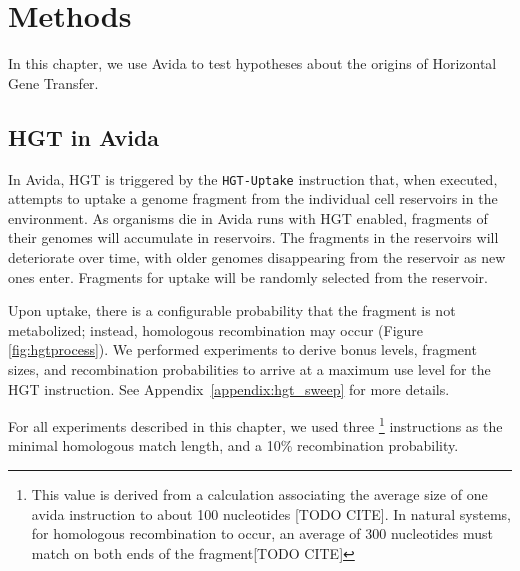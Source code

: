 \documentclass[PhD]{msu-thesis}
\begin{document}
\section{Methods}
In this chapter, we use Avida to test hypotheses about the origins of Horizontal Gene Transfer. 

\subsection{HGT in Avida}
In Avida, HGT is triggered by the \texttt{HGT-Uptake} instruction that, when executed, attempts to uptake a genome fragment from the individual cell reservoirs in the environment. As organisms die in Avida runs with HGT enabled, fragments of their genomes will accumulate in reservoirs. The fragments in the reservoirs will deteriorate over time, with older genomes disappearing from the reservoir as new ones enter. Fragments for uptake will be randomly selected from the reservoir.  

Upon uptake, there is a configurable probability that the fragment is not metabolized; instead, homologous recombination may occur (Figure \ref{fig:hgtprocess}). We performed experiments to derive bonus levels, fragment sizes, and recombination probabilities to arrive at a maximum use level for the HGT instruction. See Appendix~\ref{appendix:hgt_sweep} for more details. 

For all experiments described in this chapter, we used three \footnote{This value is derived from a calculation associating the average size of one avida instruction to about 100 nucleotides [TODO CITE]. In natural systems, for homologous recombination to occur, an average of 300 nucleotides must match on both ends of the fragment[TODO CITE]} instructions as the minimal homologous match length, and a 10\% recombination probability.
\end{document}
